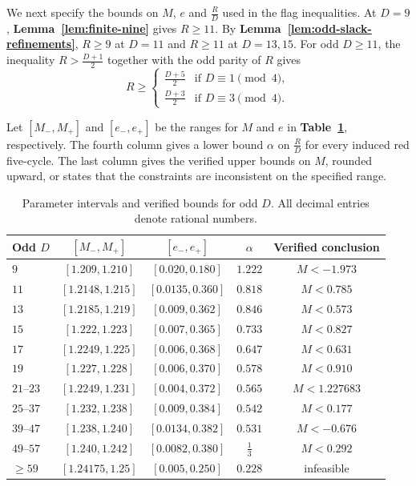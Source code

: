 \documentclass[preprint,11pt,numbers]{elsarticle-arxiv}
\numberwithin{equation}{section}
\theoremstyle{definition}
\begin{document}
We next specify the bounds on $M$, $e$ and $\frac{R}{D}$ used in
the flag inequalities. At $D=9$,
\textbf{Lemma~\ref{lem:finite-nine}} gives $R\geq11$.
By \textbf{Lemma~\ref{lem:odd-slack-refinements}},
$R\geq9$ at $D=11$ and $R\geq11$ at $D=13,15$.
For odd $D\geq11$, the inequality $R>\frac{D+1}{2}$ together with the
odd parity of $R$ gives
\begin{equation}\label{eq:multi-slack}
 R\geq
 \begin{cases}
 \frac{D+5}{2} & \text{if }D\equiv1\pmod4,\\
 \frac{D+3}{2} & \text{if }D\equiv3\pmod4.
 \end{cases}
\end{equation}

Let $[M_-,M_+]$ and $[e_-,e_+]$ be the ranges for $M$ and $e$
in \textbf{Table~\ref{tab:multi-odd}}, respectively. The fourth
column gives a lower bound $\alpha$ on $\frac{R}{D}$ for every
induced red five-cycle. The last column gives the verified upper
bounds on $M$, rounded upward, or states that the constraints are
inconsistent on the specified range.

\begin{table}[t]
\centering
\small
\begin{tabular}{@{}lcccc@{}}
\toprule
Odd $D$ & $[M_-,M_+]$ & $[e_-,e_+]$ & $\alpha$ & Verified conclusion\\
\midrule
$9$        & $[1.209,1.210]$  & $[0.020,0.180]$   & $1.222$ & $M<-1.973$\\
$11$       & $[1.2148,1.215]$ & $[0.0135,0.360]$  & $0.818$ & $M<0.785$\\
$13$       & $[1.2185,1.219]$ & $[0.009,0.362]$   & $0.846$ & $M<0.573$\\
$15$       & $[1.222,1.223]$  & $[0.007,0.365]$   & $0.733$ & $M<0.827$\\
$17$       & $[1.2249,1.225]$ & $[0.006,0.368]$   & $0.647$ & $M<0.631$\\
$19$       & $[1.227,1.228]$  & $[0.006,0.370]$   & $0.578$ & $M<0.910$\\
$21$--$23$ & $[1.2249,1.231]$ & $[0.004,0.372]$   & $0.565$ & $M<1.227683$\\
$25$--$37$ & $[1.232,1.238]$  & $[0.009,0.384]$   & $0.542$ & $M<0.177$\\
$39$--$47$ & $[1.238,1.240]$  & $[0.0134,0.382]$  & $0.531$ & $M<-0.676$\\
$49$--$57$ & $[1.240,1.242]$  & $[0.0082,0.380]$  & $\frac{1}{3}$ & $M<0.292$\\
$\ge59$    & $[1.24175,1.25]$ & $[0.005,0.250]$   & $0.228$ & infeasible\\
\bottomrule
\end{tabular}
\caption{Parameter intervals and verified bounds for odd $D$. All decimal entries denote rational numbers.}
\label{tab:multi-odd}
\end{table}
\end{document}
